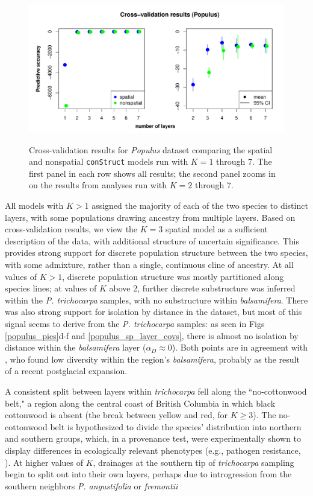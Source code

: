 \documentclass[10pt,letterpaper]{article}
\newcommand{\tri}{\textit{trichocarpa}}
\newcommand{\bals}{\textit{balsamifera}}
\begin{document}
\begin{figure}
	\centering
		{\includegraphics[width=\textwidth]{figs/populus/populus_std_xval.pdf}}
	\caption{
	Cross-validation results for \textit{Populus} dataset 
	comparing the spatial and nonspatial \texttt{conStruct} models run with $K=1$ through 7.  
	The first panel in each row shows all results; 
	the second panel zooms in on the results from analyses run with $K = 2$ through 7.
    }\label{populus_xvals}
\end{figure}

All models with $K>1$ assigned the majority of each of the two species
to distinct layers, with some populations drawing ancestry from multiple layers.
Based on cross-validation results, we view the $K=3$ spatial model 
as a sufficient description of the data,
with additional structure of uncertain significance.
This provides strong support for discrete population structure between the two species,
with some admixture,
rather than a single, continuous cline of ancestry.
At all values of $K>1$, discrete population structure was mostly partitioned along species lines; 
at values of $K$ above 2, further discrete substructure was inferred within the \textit{P. trichocarpa} samples,
with no substructure within \bals{}.
There was also strong support for isolation by distance in the dataset, 
but most of this signal seems to derive from the \textit{P. trichocarpa} samples:
as seen in Figs \ref{populus_pies}d-f and \ref{populus_sp_layer_covs},
there is almost no isolation by distance within the \bals{} layer ($\alpha_D \approx 0$).
Both points are
in agreement with \cite{keller_etal_2010}, 
who found low diversity within the region's \bals{},
probably as the result of a recent postglacial expansion.

A consistent split between layers within \tri{} fell along the ``no-cottonwood belt," 
a region along the central coast of British Columbia in which black
cottonwood is absent (the break between yellow and red, for $K \geq 3$). 
The no-cottonwood belt is hypothesized to divide the species' distribution
into northern and southern groups, which, in a provenance test, 
were experimentally shown to display differences in ecologically relevant phenotypes 
(e.g., pathogen resistance, \cite{xie2009,xie2012}).  
At higher values of $K$, drainages at the southern tip of \tri{} sampling 
begin to split out into their own layers,
perhaps due to introgression from the southern neighbors
\textit{P. angustifolia} or \textit{fremontii} \cite{Zhou2012,geraldes_etal_2014}
\end{document}
